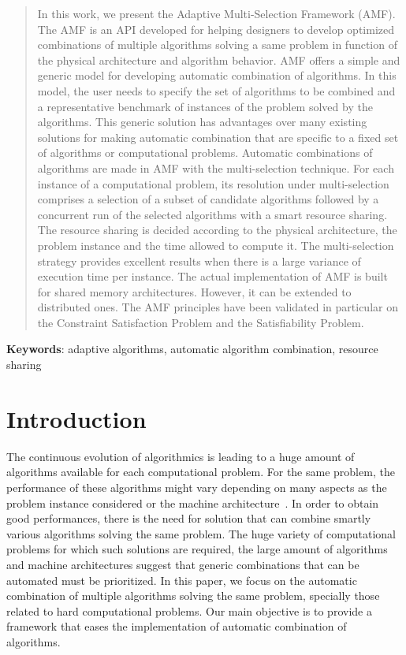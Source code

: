 \begin{abstract}

In this work, we present the Adaptive Multi-Selection Framework (AMF). The AMF is an API 
developed for helping designers to develop optimized combinations of multiple algorithms solving a same 
problem in function of the physical architecture and algorithm behavior. AMF offers a simple 
and generic model for developing automatic combination of algorithms. 
In this model, the user needs to specify the set of algorithms to be combined and a representative 
benchmark of instances of the problem solved by the algorithms. This generic solution has advantages  
over many existing solutions for making automatic combination  that are  specific to 
a fixed set of algorithms or computational problems.
Automatic combinations of algorithms are made in AMF with the multi-selection technique. 
For each instance of a computational problem, its resolution under  multi-selection comprises  
a selection of a subset of candidate algorithms followed by a concurrent run of the selected algorithms 
with a smart resource sharing. The resource sharing is decided according to the physical architecture, the problem instance and 
the time allowed to compute it. The multi-selection strategy provides excellent results 
when there is a large variance of execution time per instance. 
The actual implementation of AMF is built for shared memory architectures. However, it can be extended to 
distributed ones. The AMF principles have  been validated in particular on the Constraint Satisfaction Problem and 
the Satisfiability Problem.
\end{abstract}


\centerline{{\bf Keywords}: adaptive algorithms, automatic algorithm combination, resource sharing }


\section{Introduction}

The continuous evolution of algorithmics is leading to a huge amount of algorithms available for each 
computational problem. For the same problem, the performance of these algorithms might vary depending on 
many aspects as the problem instance considered or the machine architecture~\cite{STAPL,Spiral}. In order to obtain good 
performances, there is the need for solution that can combine smartly various algorithms solving the same problem. 
The huge variety of computational problems for which such solutions are required, the large amount of 
algorithms and machine architectures suggest that  generic combinations that can be automated must be 
prioritized.
In this paper, we focus on the automatic combination of multiple algorithms solving the same problem, specially those related to hard computational problems. Our main objective is to provide a 
framework that eases the implementation of automatic combination of algorithms.

